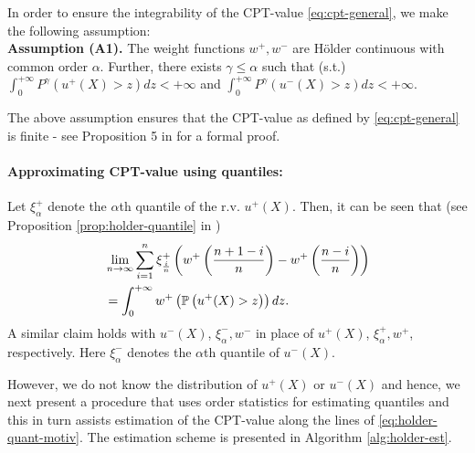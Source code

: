 In order to ensure the integrability of the CPT-value \eqref{eq:cpt-general}, we make the following assumption:\\[1ex]
\textbf{Assumption (A1).}  
The weight functions $w^+, w^-$ are H\"{o}lder continuous with common order $\alpha$. Further,
there exists $ \gamma \le \alpha$ such that (s.t.)
$\int_0^{+\infty} P^{\gamma} (u^+(X)>z) dz < +\infty$ and $\int_0^{+\infty} P^{\gamma} (u^-(X)>z) dz < +\infty.$

The above assumption ensures that the CPT-value as defined by \eqref{eq:cpt-general} is finite - see Proposition 5 in 
\cite{Pracheng2015cpt} for a formal proof.


\paragraph{Approximating CPT-value using quantiles:}
Let $\xi^+_{\alpha}$ denote the $\alpha$th quantile of the r.v. $u^+(X)$. 
Then, it can be seen that (see Proposition \ref{prop:holder-quantile} in \cite{Pracheng2015cpt})
\begin{align}
&\lim_{n \rightarrow \infty} \sum_{i=1}^{n} \xi^+_{\frac{i}{n}} \left(w^+\left(\frac{n+1-i}{n}\right)- w^+\left(\frac{n-i}{n}\right) \right) \nonumber\\
&= \int_0^{+\infty} w^+\left(\mathbb{P}\left( u^+(X)>z \right)\right) dz.\label{eq:holder-quant-motiv}
\end{align}
A similar claim holds with $u^-(X)$, $\xi^-_{\alpha}, w^-$ in place of  $u^+(X)$, $\xi^+_{\alpha}, w^+$, respectively. Here $\xi^-_{\alpha}$ denotes the 
$\alpha$th quantile of $u^-(X)$.

However, we do not know the distribution of $u^+(X)$ or $u^-(X)$ and hence, we next present a procedure that uses order statistics for estimating quantiles and this in turn assists estimation of the CPT-value along the lines of \eqref{eq:holder-quant-motiv}. The estimation scheme is presented in Algorithm \ref{alg:holder-est}.

